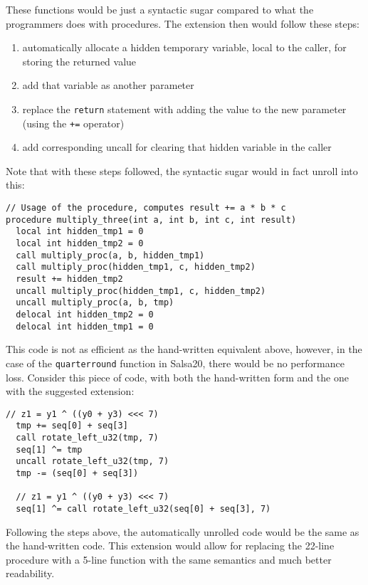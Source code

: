 \documentclass[a4paper,10pt,openright]{memoir}
\newcommand{\code}[1]{\texttt{#1}}
\begin{document}
These functions would be just a syntactic sugar compared to what the 
programmers does with procedures. The extension then would follow these 
steps:

\begin{enumerate}
\item automatically allocate a hidden temporary variable, local to the caller, for storing the returned value
\item add that variable as another parameter
\item replace the \code{return} statement with adding the value to the new parameter (using the \code{+=} operator)
\item add corresponding uncall for clearing that hidden variable in the caller
\end{enumerate}

Note that with these steps followed, the syntactic sugar would in fact 
unroll into this:

\begin{lstlisting}[language=Janus]
// Usage of the procedure, computes result += a * b * c
procedure multiply_three(int a, int b, int c, int result)
  local int hidden_tmp1 = 0
  local int hidden_tmp2 = 0
  call multiply_proc(a, b, hidden_tmp1)
  call multiply_proc(hidden_tmp1, c, hidden_tmp2)
  result += hidden_tmp2
  uncall multiply_proc(hidden_tmp1, c, hidden_tmp2)
  uncall multiply_proc(a, b, tmp)
  delocal int hidden_tmp2 = 0
  delocal int hidden_tmp1 = 0
\end{lstlisting}

This code is not as efficient as the hand-written equivalent above, 
however, in the case of the \code{quarterround} function in Salsa20, 
there would be no performance loss. Consider this piece of code, 
with both the hand-written form and the one with the suggested 
extension:

\begin{lstlisting}[language=Janus]
  // z1 = y1 ^ ((y0 + y3) <<< 7)
  tmp += seq[0] + seq[3]
  call rotate_left_u32(tmp, 7)
  seq[1] ^= tmp
  uncall rotate_left_u32(tmp, 7)
  tmp -= (seq[0] + seq[3])
  
  // z1 = y1 ^ ((y0 + y3) <<< 7)
  seq[1] ^= call rotate_left_u32(seq[0] + seq[3], 7)
\end{lstlisting}

Following the steps above, the automatically unrolled code would be the 
same as the hand-written code. This extension would allow for replacing 
the 22-line procedure with a 5-line function with the same semantics 
and much better readability.
\end{document}
